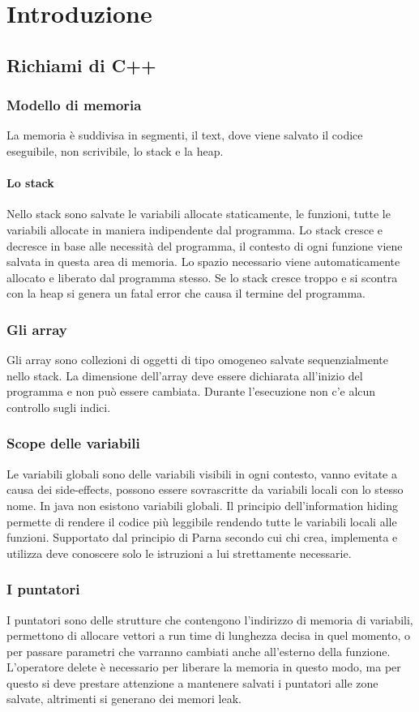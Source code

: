 \chapter{Introduzione}
\section{Richiami di C++}
\subsection{Modello di memoria}
La memoria \`e suddivisa in segmenti, il text, dove viene salvato il codice eseguibile, non scrivibile, lo stack e la heap.
\subsubsection{Lo stack}
Nello stack sono salvate le variabili allocate staticamente, le funzioni, tutte le variabili allocate in maniera indipendente dal programma. Lo stack cresce e decresce in
base alle necessit\`a del programma, il contesto di ogni funzione viene salvata in questa area di memoria. Lo spazio necessario viene automaticamente allocato e liberato dal
programma stesso. Se lo stack cresce troppo e si scontra con la heap si genera un fatal error che causa il termine del programma.
\subsection{Gli array}
Gli array sono collezioni di oggetti di tipo omogeneo salvate sequenzialmente nello stack. La dimensione dell'array deve essere dichiarata all'inizio del programma e non pu\`o 
essere cambiata. Durante l'esecuzione non c'e alcun controllo sugli indici.
\subsection{Scope delle variabili}
Le variabili globali sono delle variabili visibili in ogni contesto, vanno evitate a causa dei side-effects, possono essere sovrascritte da variabili locali con lo stesso nome. 
In java non esistono variabili globali. Il principio dell'information hiding permette di rendere il codice pi\`u leggibile rendendo tutte le variabili locali alle funzioni. 
Supportato dal principio di Parna secondo cui chi crea, implementa e utilizza deve conoscere solo le istruzioni a lui strettamente necessarie.
\subsection{I puntatori}
I puntatori sono delle strutture che contengono l'indirizzo di memoria di variabili, permettono di allocare vettori a run time di lunghezza decisa in quel momento, o per
passare parametri che varranno cambiati anche all'esterno della funzione. L'operatore delete \`e necessario per liberare la memoria in questo modo, ma per questo si deve 
prestare attenzione a mantenere salvati i puntatori alle zone salvate, altrimenti si generano dei memori leak.
